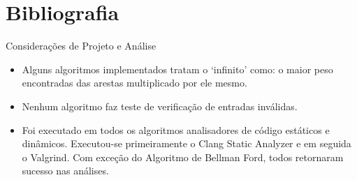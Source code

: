 \documentclass{beamer}
\begin{document}
\section{Bibliografia}




\maketitle


\begin{frame}{Considerações de Projeto e Análise}
	
	\begin{itemize}
		\item Alguns algoritmos implementados tratam o `infinito' como: o maior peso encontradas das arestas multiplicado por ele mesmo.
		
		\bigskip
		
		\item Nenhum algoritmo faz teste de verificação de entradas inválidas.
		
		\bigskip
		
		\item Foi executado em todos os algoritmos analisadores de código estáticos e dinâmicos. Executou-se primeiramente o Clang Static Analyzer e em seguida o Valgrind. Com exceção do Algoritmo de Bellman Ford, todos retornaram sucesso nas análises.
		
	\end{itemize}
\end{frame}
\end{document}
